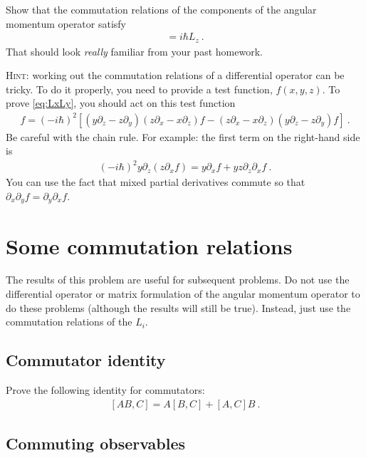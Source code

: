\documentclass[12pt]{article}
\numberwithin{equation}{section}    %
\begin{document}
Show that the commutation relations of the components of the angular momentum operator satisfy
\begin{align}
	[L_x, L_y] = i\hbar L_z \ .
	\label{eq:LxLy}
\end{align}
That should look \emph{really} familiar from your past homework.

\textsc{Hint}: working out the commutation relations of a differential operator can be tricky. To do it properly, you need to provide a test function, $f(x,y,z)$. To prove \eqref{eq:LxLy}, you should act on this test function 
\begin{align}
	[L_x, L_y]f = (-i\hbar)^2
	\left[\left(y\partial_z - z\partial_y\right)
	\left(z\partial_x - x\partial_z\right)f
	-
	\left(z\partial_x - x\partial_z\right)
	\left(y\partial_z - z\partial_y\right)
	f
	\right] \ .
\end{align}
Be careful with the chain rule. For example: the first term on the right-hand side is
\begin{align}
	(-i\hbar)^2 y\partial_z\left(z\partial_x f\right)
	= 
	y\partial_xf + yz\partial_z\partial_xf\ .
\end{align}
You can use the fact that mixed partial derivatives commute so that $\partial_x\partial_yf = \partial_y\partial_xf$.

\section{Some commutation relations}

The results of this problem are useful for subsequent problems. Do not use the differential operator or matrix formulation of the angular momentum operator to do these problems (although the results will still be true). Instead, just use the commutation relations of the $L_i$. 

\subsection{Commutator identity}

Prove the following identity for commutators:
\begin{align}
	\left[AB,C\right] = A[B,C] + [A,C]B \ .
\end{align}

\subsection{Commuting observables}
\end{document}

